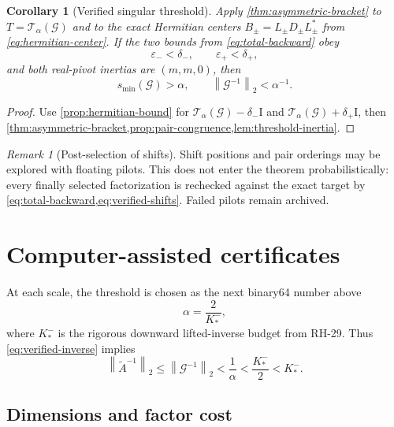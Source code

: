 \documentclass[11pt]{article}
\newtheorem{corollary}[theorem]{Corollary}
\theoremstyle{definition}
\theoremstyle{remark}
\newtheorem{remark}[theorem]{Remark}
\newcommand{\Id}{\mathrm I}
\newcommand{\norm}[1]{\left\lVert#1\right\rVert}
\newcommand{\Atilde}{\widetilde A}
\newcommand{\Gmat}{\mathcal G}
\newcommand{\Tmat}{\mathcal T}
\begin{document}
\begin{corollary}[Verified singular threshold]
\label{cor:verified-threshold}
Apply \cref{thm:asymmetric-bracket} to
$T=\Tmat_\alpha(\Gmat)$ and to the exact Hermitian centers
$B_\pm=L_\pm D_\pm L_\pm^*$ from
\cref{eq:hermitian-center}.  If the two bounds from
\cref{eq:total-backward} obey
\begin{equation}
 \varepsilon_-<\delta_-,
 \qquad
 \varepsilon_+<\delta_+,
 \label{eq:verified-shifts}
\end{equation}
and both real-pivot inertias are $(m,m,0)$, then
\begin{equation}
 s_{\min}(\Gmat)>\alpha,
 \qquad
 \norm{\Gmat^{-1}}_2<\alpha^{-1}.
 \label{eq:verified-inverse}
\end{equation}
\end{corollary}

\begin{proof}
Use \cref{prop:hermitian-bound} for
$\Tmat_\alpha(\Gmat)-\delta_-\Id$ and
$\Tmat_\alpha(\Gmat)+\delta_+\Id$, then
\cref{thm:asymmetric-bracket,prop:pair-congruence,lem:threshold-inertia}.
\end{proof}

\begin{remark}[Post-selection of shifts]
Shift positions and pair orderings may be explored with floating pilots.
This does not enter the theorem probabilistically: every finally selected
factorization is rechecked against the exact target by
\cref{eq:total-backward,eq:verified-shifts}.  Failed pilots remain archived.
\end{remark}


\section{Computer-assisted certificates}
\label{sec:results}

At each scale, the threshold is chosen as the next binary64 number above
\begin{equation}
 \alpha=\frac{2}{K_*^-},
 \label{eq:threshold-choice}
\end{equation}
where $K_*^-$ is the rigorous downward lifted-inverse budget from RH-29.
Thus \cref{eq:verified-inverse} implies
\begin{equation}
 \norm{\Atilde^{-1}}_2
 \leq\norm{\Gmat^{-1}}_2
 <\frac{1}{\alpha}
 <\frac{K_*^-}{2}
 <K_*^-.
 \label{eq:budget-consequence}
\end{equation}

\subsection{Dimensions and factor cost}
\end{document}
